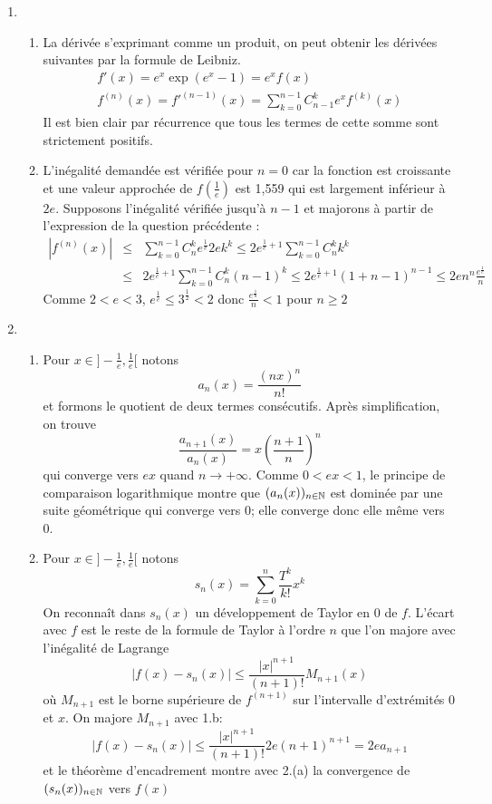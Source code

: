 \begin{enumerate}
\item \begin{enumerate}
       \item La dérivée s'exprimant comme un produit, on peut obtenir les dérivées suivantes par la formule de Leibniz.
\begin{eqnarray*}
f'(x)=e^{x}\exp (e^{x}-1)=e^{x}f(x)\\
f^{(n)}(x)=f'^{(n-1)}(x)=\sum_{k=0}^{n-1}C_{ n-1}^{k}e^{x}f^{(k)}(x)
\end{eqnarray*}
Il est bien clair par récurrence que tous les termes de cette somme sont strictement positifs.
      \item L'inégalité demandée est vérifiée pour $n=0$ car la fonction est croissante et une valeur approchée de $f(\frac{1}{e})$ est 1,559 qui est largement inférieur à $2e$. Supposons l'inégalité vérifiée jusqu'à $n-1$ et majorons à partir de l'expression de la question précédente :
\begin{eqnarray*}
|f^{(n)}(x)|&\leq& \sum _{k=0}^{n-1}C_{n}^{k}e^{\frac{1}{e}}2ek^{k}
\leq 2e^{\frac{1}{e}+1}\sum _{k=0}^{n-1}C_{n}^{k} k^{k}\\
&\leq& 2e^{\frac{1}{e}+1}\sum _{k=0}^{n-1}C_{n}^{k} (n-1)^{k}
\leq 2e^{\frac{1}{e}+1}(1+n-1)^{n-1} \leq 2en^{n}\frac{e^{\frac{1}{e}}}{n}
\end{eqnarray*}
Comme $2<e<3$, $e^{\frac{1}{e}}\leq 3^{\frac{1}{2}}<2$ donc $\frac{ e^{\frac{1}{n}}}{n} < 1$ pour $n \geq 2$
\end{enumerate}
\item \begin{enumerate}
      \item Pour $x \in ]-\frac{1}{e},\frac{1}{e}[$ notons 
$$a_{n}(x)=\frac{(nx)^{n}}{n!}$$
et formons le quotient de deux termes consécutifs. Après simplification, on trouve
$$\frac{a_{n+1}(x)}{a_{n}(x)}=x \left(\frac{n+1}{n}\right)^{n}$$
qui converge vers $ex$ quand $n\rightarrow +\infty$. Comme $0<ex<1$, le principe de comparaison logarithmique montre que $(a_n(x))_{n\in \Bbb{N}}$ est dominée par une suite géométrique qui converge vers 0; elle converge donc elle même vers 0.
     \item Pour $x \in ]-\frac{1}{e},\frac{1}{e}[$ notons
$$s_{n}(x)= \sum_{k=0}^{n}\frac{T^{k} }{k!} x^{k}$$
On reconnaît dans $s_{n}(x)$ un développement de Taylor en 0 de $f$. L'écart avec $f$ est le reste de la formule de Taylor à l'ordre $n$ que l'on majore avec l'inégalité de Lagrange 
$$|f(x)-s_{n}(x)|\leq \frac{|x|^{n+1}}{(n+1)!}M_{n+1}(x)$$
où $M_{n+1}$ est le borne supérieure de $f^{(n+1)}$ sur l'intervalle d'extrémités 0 et $x$. On majore $M_{n+1}$ avec 1.b:
$$|f(x)-s_{n}(x)|\leq \frac{|x|^{n+1}}{(n+1)!}2e (n+1)^{n+1}=2ea_{n+1}$$
et le théorème d'encadrement montre avec 2.(a) la convergence de $(s_n(x))_{n\in \Bbb{N}}$ vers $f(x)$
\end{enumerate}


\end{enumerate}
